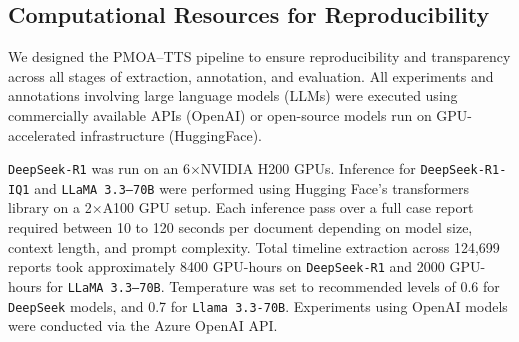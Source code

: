 
\subsection{Computational Resources for Reproducibility}
We designed the PMOA–TTS pipeline to ensure reproducibility and transparency across all stages of extraction, annotation, and evaluation. All experiments and annotations involving large language models (LLMs) were executed using commercially available APIs (OpenAI) or open-source models run on GPU-accelerated infrastructure (HuggingFace).

\texttt{DeepSeek-R1} was run on an 6$\times$NVIDIA H200 GPUs. Inference for \texttt{DeepSeek-R1-IQ1} and \texttt{LLaMA 3.3–70B} were performed using Hugging Face’s transformers library on a 2$\times$A100 GPU setup. Each inference pass over a full case report required between 10 to 120 seconds per document depending on model size, context length, and prompt complexity. Total timeline extraction across 124,699 reports took approximately 8400 GPU-hours on \texttt{DeepSeek-R1} and 2000 GPU-hours for \texttt{LLaMA 3.3–70B}.  Temperature was set to recommended levels of 0.6 for \texttt{DeepSeek} models, and 0.7 for \texttt{Llama 3.3-70B}.
Experiments using OpenAI  models were conducted via the Azure OpenAI API.
